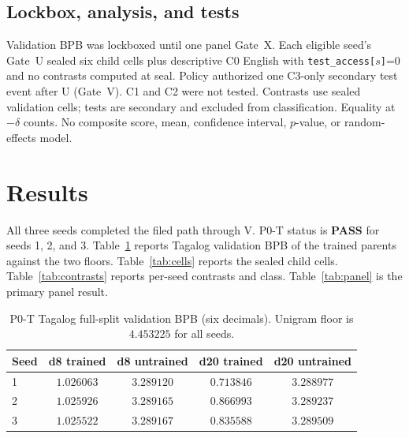 \documentclass[11pt,a4paper]{article}
\begin{document}
\subsection{Lockbox, analysis, and tests}
Validation BPB was lockboxed until one panel Gate~X. Each eligible seed's Gate~U sealed six child cells plus descriptive C0 English with \texttt{test\_access[$s$]}=0 and no contrasts computed at seal. Policy authorized one C3-only secondary test event after U (Gate~V). C1 and C2 were not tested. Contrasts use sealed validation cells; tests are secondary and excluded from classification. Equality at $-\delta$ counts. No composite score, mean, confidence interval, $p$-value, or random-effects model.

\section{Results}
\label{sec:results}

All three seeds completed the filed path through V. P0-T status is \textbf{PASS} for seeds 1, 2, and 3. Table~\ref{tab:p0t} reports Tagalog validation BPB of the trained parents against the two floors. Table~\ref{tab:cells} reports the sealed child cells. Table~\ref{tab:contrasts} reports per-seed contrasts and class. Table~\ref{tab:panel} is the primary panel result.

\begin{table}[ht]
\centering
\caption{P0-T Tagalog full-split validation BPB (six decimals). Unigram floor is $4.453225$ for all seeds.}
\label{tab:p0t}
\begin{tabular}{lcccc}
\toprule
Seed & d8 trained & d8 untrained & d20 trained & d20 untrained \\
\midrule
1 & $1.026063$ & $3.289120$ & $0.713846$ & $3.288977$ \\
2 & $1.025926$ & $3.289165$ & $0.866993$ & $3.289237$ \\
3 & $1.025522$ & $3.289167$ & $0.835588$ & $3.289509$ \\
\bottomrule
\end{tabular}
\end{table}
\end{document}
